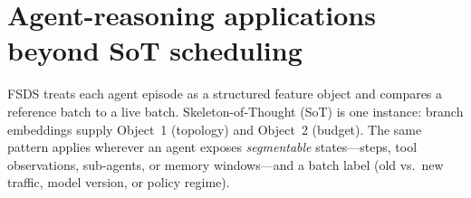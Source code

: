 
\section{Agent-reasoning applications beyond SoT scheduling}
\label{sec:agent-apps}

FSDS treats each agent episode as a structured feature object and compares a
reference batch to a live batch. Skeleton-of-Thought (SoT) is one instance:
branch embeddings supply Object~1 (topology) and Object~2 (budget). The same
pattern applies wherever an agent exposes \emph{segmentable} states---steps,
tool observations, sub-agents, or memory windows---and a batch label
(old vs.\ new traffic, model version, or policy regime).


